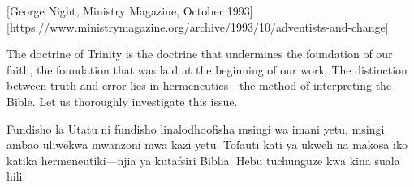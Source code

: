 [George Night, Ministry Magazine, October 1993][https://www.ministrymagazine.org/archive/1993/10/adventists-and-change]


The doctrine of Trinity is the doctrine that undermines the foundation of our faith, the foundation that was laid at the beginning of our work. The distinction between truth and error lies in hermeneutics—the method of interpreting the Bible. Let us thoroughly investigate this issue.


Fundisho la Utatu ni fundisho linalodhoofisha msingi wa imani yetu, msingi ambao uliwekwa mwanzoni mwa kazi yetu. Tofauti kati ya ukweli na makosa iko katika hermeneutiki—njia ya kutafsiri Biblia. Hebu tuchunguze kwa kina suala hili.






